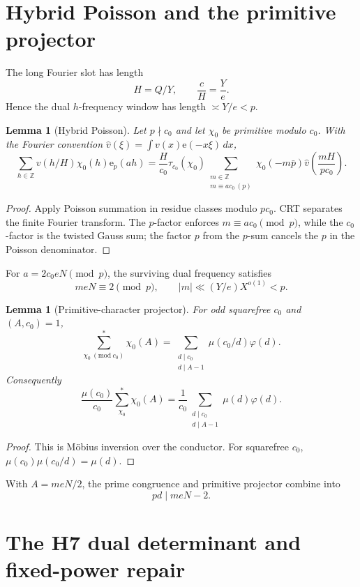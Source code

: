 \documentclass[11pt]{article}
\newtheorem{lemma}[theorem]{Lemma}
\theoremstyle{definition}
\theoremstyle{remark}
\newcommand{\e}{\mathrm{e}}
\newcommand{\1}{\mathbf 1}
\begin{document}
\section{Hybrid Poisson and the primitive projector}

The long Fourier slot has length
\[
 H=Q/Y,
 \qquad \frac cH=\frac Ye.
\]
Hence the dual $h$-frequency window has length $\asymp Y/e<p$.

\begin{lemma}[Hybrid Poisson]\label{lem:hybrid}
Let $p\nmid c_0$ and let $\chi_0$ be primitive modulo $c_0$.  With the Fourier convention
$\widehat v(\xi)=\int v(x)\e(-x\xi)\,dx$,
\[
 \boxed{
 \sum_{h\in\mathbb Z}v(h/H)\chi_0(h)\e_p(ah)
 =\frac H{c_0}\tau_{c_0}(\chi_0)
 \sum_{\substack{m\in\mathbb Z\\m\equiv ac_0\ (p)}}
 \chi_0(-m\bar p)\widehat v\!\left(\frac{mH}{pc_0}\right).}
\tag{1B-Poisson}
\]
\end{lemma}
\begin{proof}
Apply Poisson summation in residue classes modulo $pc_0$.  CRT separates the finite Fourier transform.  The
$p$-factor enforces $m\equiv ac_0\pmod p$, while the $c_0$-factor is the twisted Gauss sum; the factor $p$ from
the $p$-sum cancels the $p$ in the Poisson denominator.
\end{proof}

For $a=2c_0eN\pmod p$, the surviving dual frequency satisfies
\[
 \boxed{meN\equiv2\pmod p,
 \qquad |m|\ll (Y/e)X^{o(1)}<p.}
\tag{1B-dualfreq}
\]

\begin{lemma}[Primitive-character projector]\label{lem:projector}
For odd squarefree $c_0$ and $(A,c_0)=1$,
\[
 \boxed{\sum_{\chi_0\ (\mathrm{mod}\ c_0)}^*\chi_0(A)
 =\sum_{\substack{d\mid c_0\\d\mid A-1}}\mu(c_0/d)\varphi(d).}
\tag{1B-proj}
\]
Consequently
\[
 \boxed{\frac{\mu(c_0)}{c_0}\sum_{\chi_0}^*\chi_0(A)
 =\frac1{c_0}\sum_{\substack{d\mid c_0\\d\mid A-1}}\mu(d)\varphi(d).}
\tag{1B-proj2}
\]
\end{lemma}
\begin{proof}
This is M\"obius inversion over the conductor.  For squarefree $c_0$,
$\mu(c_0)\mu(c_0/d)=\mu(d)$.
\end{proof}

With $A=meN/2$, the prime congruence and primitive projector combine into
\[
 \boxed{pd\mid meN-2.}
\tag{1B-detproj}
\]

\section{The H7 dual determinant and fixed-power repair}
\end{document}

